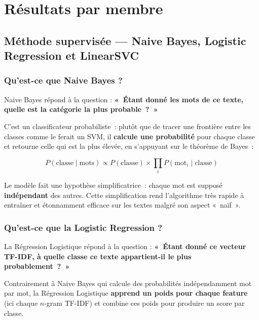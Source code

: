 \documentclass[12pt,a4paper]{report}
\begin{document}
\pagebreak

\section{Résultats par membre}

\subsection{Méthode supervisée --- Naive Bayes, Logistic Regression et LinearSVC}

\subsubsection*{Qu'est-ce que Naive Bayes ?}

Naive Bayes répond à la question : \textbf{«~Étant donné les mots de ce texte, quelle est la catégorie la plus probable~?~»}

C'est un classificateur probabiliste~: plutôt que de tracer une frontière entre les classes comme le ferait un SVM, il \textbf{calcule une probabilité} pour chaque classe et retourne celle qui est la plus élevée, en s'appuyant sur le théorème de Bayes~:

\[
  P(\text{classe} \mid \text{mots}) \propto P(\text{classe}) \times \prod_i P(\text{mot}_i \mid \text{classe})
\]

Le modèle fait une hypothèse simplificatrice~: chaque mot est supposé \textbf{indépendant} des autres. Cette simplification rend l'algorithme très rapide à entraîner et étonnamment efficace sur les textes malgré son aspect «~naïf~».

\subsubsection*{Qu'est-ce que la Logistic Regression ?}

La Régression Logistique répond à la question : \textbf{«~Étant donné ce vecteur TF-IDF, à quelle classe ce texte appartient-il le plus probablement~?~»}

Contrairement à Naive Bayes qui calcule des probabilités indépendamment mot par mot, la Régression Logistique \textbf{apprend un poids pour chaque feature} (ici chaque $n$-gram TF-IDF) et combine ces poids pour produire un score par classe.
\end{document}
